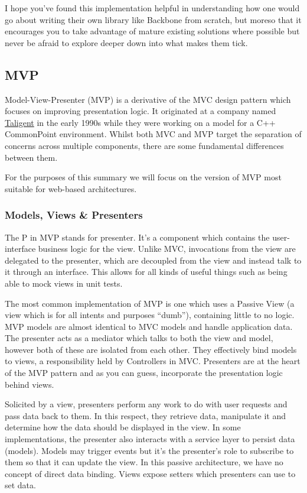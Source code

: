 \documentclass[9pt]{book}
\begin{document}
I hope you've found this implementation helpful in understanding how one
would go about writing their own library like Backbone from scratch, but
moreso that it encourages you to take advantage of mature existing
solutions where possible but never be afraid to explore deeper down into
what makes them tick.

\subsection{MVP}\label{mvp}

Model-View-Presenter (MVP) is a derivative of the MVC design pattern
which focuses on improving presentation logic. It originated at a
company named \href{http://en.wikipedia.org/wiki/Taligent}{Taligent} in
the early 1990s while they were working on a model for a C++ CommonPoint
environment. Whilst both MVC and MVP target the separation of concerns
across multiple components, there are some fundamental differences
between them.

For the purposes of this summary we will focus on the version of MVP
most suitable for web-based architectures.

\subsubsection{Models, Views \&
Presenters}\label{models-views-presenters}

The P in MVP stands for presenter. It's a component which contains the
user-interface business logic for the view. Unlike MVC, invocations from
the view are delegated to the presenter, which are decoupled from the
view and instead talk to it through an interface. This allows for all
kinds of useful things such as being able to mock views in unit tests.

The most common implementation of MVP is one which uses a Passive View
(a view which is for all intents and purposes ``dumb''), containing
little to no logic. MVP models are almost identical to MVC models and
handle application data. The presenter acts as a mediator which talks to
both the view and model, however both of these are isolated from each
other. They effectively bind models to views, a responsibility held by
Controllers in MVC. Presenters are at the heart of the MVP pattern and
as you can guess, incorporate the presentation logic behind views.

Solicited by a view, presenters perform any work to do with user
requests and pass data back to them. In this respect, they retrieve
data, manipulate it and determine how the data should be displayed in
the view. In some implementations, the presenter also interacts with a
service layer to persist data (models). Models may trigger events but
it's the presenter's role to subscribe to them so that it can update the
view. In this passive architecture, we have no concept of direct data
binding. Views expose setters which presenters can use to set data.
\end{document}
